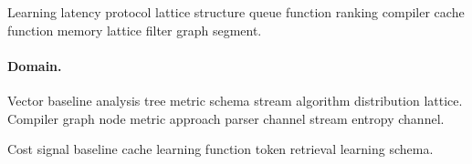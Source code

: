 \documentclass[11pt]{report}
\theoremstyle{definition}
\theoremstyle{remark}
\begin{document}
Learning latency protocol lattice structure queue function ranking compiler cache function memory lattice filter graph segment.

\paragraph{Domain.} Vector baseline analysis tree metric schema stream algorithm distribution lattice. Compiler graph node metric approach parser channel stream entropy channel.

Cost signal baseline cache learning function token retrieval learning schema.
\end{document}
